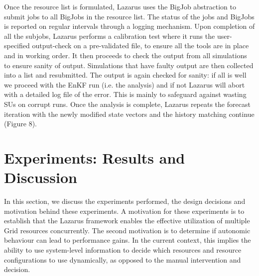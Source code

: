 \documentclass{sig-alternate}
\begin{document}
Once the resource list is formulated, Lazarus uses the BigJob
abstraction to submit jobs to all BigJobs in the resource list. The
status of the jobs and BigJobs is reported on regular intervals
through a logging mechanism. Upon completion of all the subjobs,
Lazarus performs a calibration test where it runs the user-specified
output-check on a pre-validated file, to ensure all the tools are in
place and in working order. It then proceeds to check the output from
all simulations to ensure sanity of output. Simulations that have
faulty output are then collected into a list and resubmitted. The
output is again checked for sanity: if all is well we proceed with the
EnKF run (i.e. the analysis) and if not Lazarus will abort with a
detailed log file of the error. This is mainly to safeguard against
wasting SUs on corrupt runs. Once the analysis is complete, Lazarus
repeats the forecast iteration with the newly modified state vectors
and the history matching continue (Figure 8).


\section{Experiments: Results and \\ Discussion}

In this section, we discuss the experiments performed, the design decisions and motivation behind these experiments. %
A motivation for these experiments is to establish that the Lazarus framework enables the effective utilization of multiple Grid resources concurrently. The second motivation is to determine if autonomic behaviour can lead to performance gains.  In the current context, this implies the ability to use system-level information to decide which resources and resource configurations to use dynamically, as opposed to the manual intervention and decision.
\end{document}
